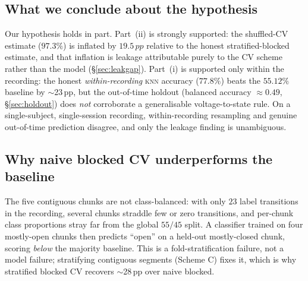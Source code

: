 \documentclass[11pt]{article}
\newcommand{\pp}{\,pp}          %
\newcommand{\knn}{\textsc{knn}}
\begin{document}
\subsection{What we conclude about the hypothesis}

Our hypothesis holds in part. Part~(ii) is strongly supported: the
shuffled-CV estimate ($97.3\%$) is inflated by $19.5\pp$ relative to the
honest stratified-blocked estimate, and that inflation is leakage
attributable purely to the CV scheme rather than the model
(\S\ref{sec:leakgap}). Part~(i)
is supported only within the recording: the honest \emph{within-recording}
\knn{} accuracy ($77.8\%$) beats the $55.12\%$ baseline by $\sim$23\pp, but
the out-of-time holdout (balanced accuracy $\approx 0.49$,
\S\ref{sec:holdout}) does \emph{not} corroborate a generalisable
voltage-to-state rule. On a single-subject,
single-session recording, within-recording resampling and genuine
out-of-time prediction disagree, and only the leakage finding is
unambiguous.

\subsection{Why naive blocked CV underperforms the baseline}
\label{sec:naive}
The five contiguous chunks are not class-balanced: with only $23$ label
transitions in the recording, several chunks straddle few or zero
transitions, and per-chunk class proportions stray far from the global
$55/45$ split. A classifier trained on four mostly-open chunks then
predicts ``open'' on a held-out mostly-closed chunk, scoring \emph{below}
the majority baseline. This is a fold-stratification failure, not a model
failure; stratifying contiguous segments (Scheme C) fixes it, which is why
stratified blocked CV recovers $\sim$28\pp{} over naive blocked.
\end{document}
